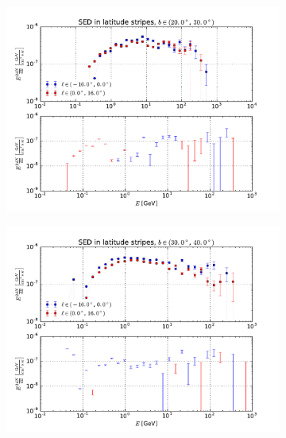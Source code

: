 \documentclass[a4paper]{article}
\begin{document}
\begin{figure}
    \begin{subfigure}{0.5\textwidth}
        \includegraphics[width=\textwidth]{spectrum_of_top_bubble_in_lat_stripes_20-30.pdf}
    \end{subfigure} 
    \begin{subfigure}{0.5\textwidth}
        \includegraphics[width=\textwidth]{spectrum_of_top_bubble_in_lat_stripes_30-40.pdf}
    \end{subfigure}
    \begin{subfigure}{0.5\textwidth}

\end{subfigure}
\end{figure}
\end{document}
